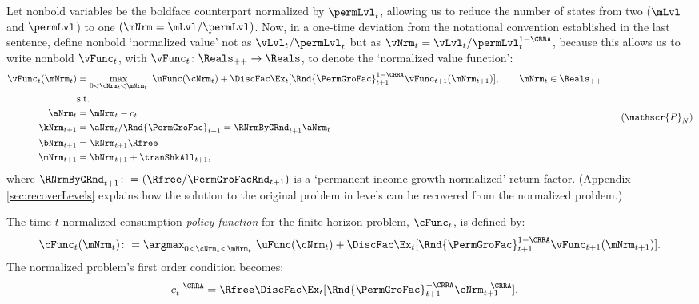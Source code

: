 \documentclass[BufferStockTheory]{subfiles}
\begin{document}
Let nonbold variables be the boldface counterpart normalized by $\permLvl_{t}$, allowing us to reduce the number of states from two ($\mLvl$ and $\permLvl$) to one $(\mNrm = \mLvl/\permLvl)$.
Now, in a one-time deviation from the notational convention established in the last sentence, define nonbold `normalized value' not as $\vLvl_{t}/\permLvl_{t}$ but as $\vNrm_{t} = \vLvl_{t}/\permLvl_{t}^{1-\CRRA}$, because this allows us to write nonbold $\vFunc_{t}$, with $\vFunc_{t}\colon \Reals_{++}\rightarrow \Reals$, to denote the `normalized value function':
%
%
\begin{equation}\label{eq:veqnNrmRecBellman}
  \begin{split}
    \vFunc_{t}(\mNrm_{t})  & = \max_{0<\cNrm_{t}< \mNrm_{t}}~  \uFunc(\cNrm_{t}) +\DiscFac \Ex_{t}[\Rnd{\PermGroFac}_{t+1}^{1-\CRRA}\vFunc_{t+1}({\mNrm}_{t+1})],\qquad  \mNrm_{t}\in \Reals_{++}\\
    & \mbox{s.t.}
    \\ {\aNrm}_{t}  & = \mNrm_{t}-c_{t}
    \\ {\kNrm}_{t+1} & = \aNrm_{t}/\Rnd{\PermGroFac}_{t+1} =  \RNrmByGRnd_{t+1}\aNrm_{t}
    \\ {\bNrm}_{t+1} & = \kNrm_{t+1} \Rfree %
    \\ \mNrm_{t+1}  & = \bNrm_{t+1} +\tranShkAll_{t+1} ,
  \end{split}  \tag{$\mathscr{P}_{N}$}
\end{equation}
where $\RNrmByGRnd_{t+1}\colon = (\Rfree/\PermGroFacRnd_{t+1})$ is a `permanent-income-growth-normalized' return factor.
(Appendix \ref{sec:recoverLevels} explains how the solution to the original problem in levels can be recovered from the normalized problem.)

The time $t$ normalized consumption \textit{policy function} for the finite-horizon problem, $\cFunc_{t}$, is defined by:
%
\begin{equation}\label{eq:cfunceq1}
    \cFunc_{t}(\mNrm_{t})\colon  = \argmax_{0<\cNrm_{t}< \mNrm_{t}}~  \uFunc(\cNrm_{t}) +\DiscFac \Ex_{t}[\Rnd{\PermGroFac}_{t+1}^{1-\CRRA}\vFunc_{t+1}(\mNrm_{t+1} )].
\end{equation}
% 
The normalized problem's first order condition becomes:
\begin{align}
  c_{t}^{-\CRRA}  & = \Rfree \DiscFac \Ex_{t}[ \Rnd{\PermGroFac}_{t+1}^{-\CRRA} \cNrm_{t+1}^{-\CRRA}].  \label{eq:scaledeuler}
\end{align}
\end{document}
